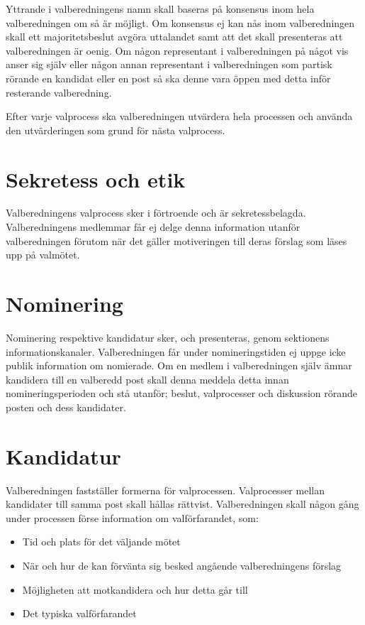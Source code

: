 \documentclass{dsekprotokoll}
\begin{document}
Yttrande i valberedningens namn skall baseras på konsensus inom hela
valberedningen om
så är möjligt. Om konsensus ej kan nås inom valberedningen skall ett
majoritetsbeslut avgöra
uttalandet samt att det skall presenteras att valberedningen är oenig.
Om någon representant i valberedningen på något vis anser sig själv
eller någon annan representant i valberedningen som partisk rörande
en kandidat eller en post så ska denne vara
öppen med detta inför resterande valberedning.

Efter varje valprocess ska valberedningen utvärdera hela processen
och använda den utvärderingen som grund för nästa valprocess.

\section{Sekretess och etik}
Valberedningens valprocess sker i förtroende och är sekretessbelagda.
Valberedningens medlemmar får ej delge denna information
utanför valberedningen förutom när det gäller motiveringen till deras
förslag som läses
upp på valmötet.

\section{Nominering}
Nominering respektive kandidatur sker, och presenteras, genom
sektionens informationskanaler. Valberedningen får under
nomineringstiden ej uppge icke publik information om nomierade. Om en
medlem i valberedningen själv ämnar kandidera till en valberedd post skall
denna meddela detta innan nomineringsperioden och stå utanför;
beslut, valprocesser och diskussion rörande posten och dess kandidater.

\section{Kandidatur}
Valberedningen fastställer formerna för valprocessen. Valprocesser
mellan kandidater till samma post
skall hållas rättvist. Valberedningen skall någon gång under
processen förse information om valförfarandet, som:
\begin{itemize}
  \item Tid och plats för det väljande mötet
  \item När och hur de kan förvänta sig besked angående valberedningens förslag
  \item Möjligheten att motkandidera och hur detta går till
  \item Det typiska valförfarandet
\end{itemize}
\end{document}
